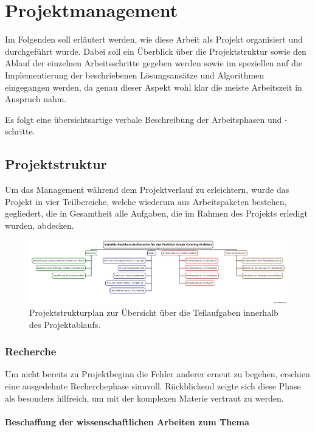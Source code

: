 \chapter{Projektmanagement}

Im Folgenden soll erläutert werden, wie diese Arbeit als Projekt organisiert und durchgeführt wurde. Dabei soll ein Überblick über die Projektstruktur sowie den Ablauf der einzelnen Arbeitsschritte gegeben werden sowie im speziellen auf die Implementierung der beschriebenen Lösungsansätze und Algorithmen eingegangen werden, da genau dieser Aspekt wohl klar die meiste Arbeitszeit in Anspruch nahm.

Es folgt eine übersichtsartige verbale Beschreibung der Arbeitsphasen und -schritte.

\section{Projektstruktur}

Um das Management während dem Projektverlauf zu erleichtern, wurde das Projekt in vier Teilbereiche, welche wiederum aus Arbeitspaketen bestehen, gegliedert, die in Gesamtheit alle Aufgaben, die im Rahmen des Projekts erledigt wurden, abdecken.

\begin{landscape}
\begin{figure}
\centering
\includegraphics[width=23cm]{img/psp.png}
\caption[Projektstrukturplan]{Pro\-jekt\-struk\-tur\-plan zur Übersicht über die Teilaufgaben innerhalb des Projektablaufs.}
\label{fig:psp}
\end{figure}
\end{landscape}

\subsection{Recherche}
Um nicht bereits zu Projektbeginn die Fehler anderer erneut zu begehen, erschien eine ausgedehnte Recherchephase sinnvoll. Rückblickend zeigte sich diese Phase als besonders hilfreich, um mit der komplexen Materie vertraut zu werden.

\subsubsection{ Beschaffung der wissenschaftlichen Arbeiten zum Thema}


